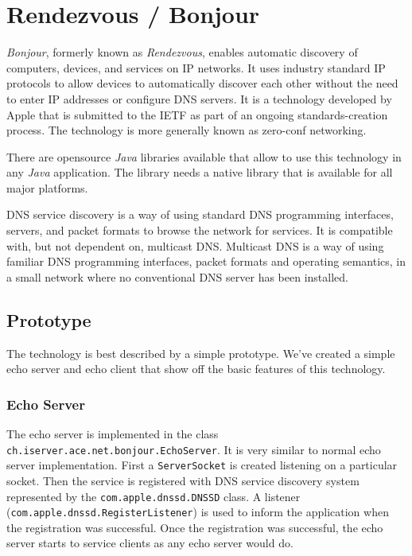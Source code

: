 \section{Rendezvous / Bonjour}
\label{sect:bonjour}

\emph{Bonjour}, formerly known as \emph{Rendezvous}, enables automatic discovery of computers, devices, and services on IP networks. It uses industry standard IP protocols to allow devices to automatically discover each other without the need to enter IP addresses or configure DNS servers. It is a technology developed by Apple that is submitted to the IETF as part of an ongoing standards-creation process. The technology is more generally known as zero-conf networking.

There are opensource \emph{Java} libraries available that allow to use this technology in any \emph{Java} application. The library needs a native library that is available for all major platforms. 

DNS service discovery is a way of using standard DNS programming interfaces, servers, and packet formats to browse the network for services. It is compatible with, but not dependent on, multicast DNS. Multicast DNS is a way of using familiar DNS programming interfaces, packet formats and operating semantics, in a small network where no conventional DNS server has been installed.


\subsection{Prototype}
The technology is best described by a simple prototype. We've created a simple echo server and echo client that show off the basic features of this technology.

\subsubsection{Echo Server}
The echo server is implemented in the class \texttt{ch.iserver.ace.net.bonjour.EchoServer}. It is very similar to normal echo server implementation. First a \texttt{ServerSocket} is created listening on a particular socket. Then the service is registered with DNS service discovery system represented by the \texttt{com.apple.dnssd.DNSSD} class. A listener (\texttt{com.apple.dnssd.RegisterListener}) is used to inform the application when the registration was successful. Once the registration was successful, the echo server starts to service clients as any echo server would do.

